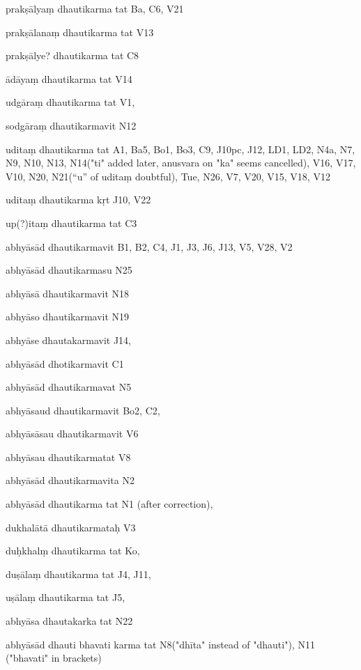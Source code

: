 \begin{ekdosis}
\begin{marma}[hp01_055]
\begin{marma}[hp02_009]
\begin{marma}[hp02_011]
        \begin{marma}[hp02_24d]
        \item[prakṣālyaṃ dhautikarma tat] Ba, C6, V21
        \item[prakṣālanaṃ dhautikarma tat] V13
        \item[prakṣālye? dhautikarma tat] C8
        \item[ādāyaṃ dhautikarma tat] V14
        \item[udgāraṃ dhautikarma tat] V1,
        \item[sodgāraṃ dhautikarmavit] N12
        \item[uditaṃ dhautikarma tat] A1, Ba5, Bo1, Bo3, C9, J10pc, J12, LD1, LD2, N4a, N7, N9, N10, N13, N14("ti" added later, anusvara on "ka" seems cancelled), V16, V17, V10, N20, N21(“u” of uditaṃ doubtful), Tue, N26, V7, V20, V15, V18, V12
        \item[uditaṃ dhautikarma kṛt] J10, V22
        \item[up(?)itaṃ dhautikarma tat] C3
        \item[abhyāsād dhautikarmavit] B1, B2, C4, J1, J3, J6, J13, V5, V28, V2
        \item[abhyāsād dhautikarmasu] N25
        \item[abhyāsā dhautikarmavit] N18
        \item[abhyāso dhautikarmavit] N19
        \item[abhyāse dhautakarmavit] J14,
        \item[abhyāsād dhotikarmavit] C1
        \item[abhyāsād dhautikarmavat] N5
        \item[abhyāsaud dhautikarmavit] Bo2, C2,
        \item[abhyāsāsau dhautikarmavit] V6
        \item[abhyāsau dhautikarmatat] V8
        \item[abhyāsād dhautikarmavita] N2
        \item[abhyāsād dhautikarma tat] N1 (after correction),
        \item[dukhalātā dhautikarmataḥ] V3
        \item[duḥkhalṃ dhautikarma tat] Ko,
        \item[duṣālaṃ dhautikarma tat] J4, J11, 
        \item[uṣālaṃ dhautikarma tat] J5,
        \item[abhyāsa dhautakarka tat] N22
        \item[abhyāsād dhauti bhavati karma tat] N8("dhīta" instead of "dhauti"), N11 ("bhavati" in brackets)

\end{marma}
\end{marma}
\end{marma}
\end{marma}
\end{ekdosis}
